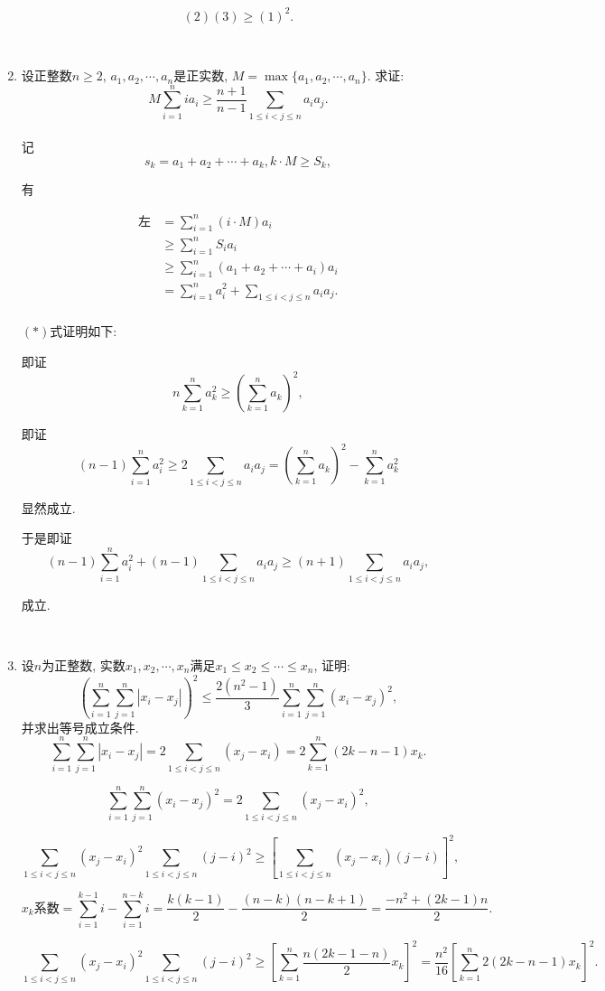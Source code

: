 \documentclass[8pt]{article}
\begin{document}
\begin{enumerate}
			$$(2) (3) \geq (1)^2.$$

		~\\

		\item 设正整数$n\geq 2$, $a_1, a_2, \cdots, a_n$是正实数, $M=\max\{a_1, a_2, \cdots, a_n\}$. 求证: $$M\sum_{i=1}^{n} ia_i \geq \frac{n+1}{n-1} \sum_{1\leq i<j\leq n} a_i a_j.$$
			~\\

			记$$s_k = a_1 + a_2 + \cdots + a_k, k \cdot M \geq S_k,$$

			有

			\begin{align*}
				\text{左} &= \sum_{i=1}^{n} (i \cdot M) a_i\\
				          &\geq \sum_{i=1}^{n} S_i a_i\\
				          &\geq \sum_{i=1}^{n} (a_1 + a_2 + \cdots + a_i) a_i \tag*{$(*)$}\\
				          &= \sum_{i=1}^{n} a_i^2 + \sum_{1\leq i<j\leq n} a_i a_j.\\
			\end{align*}

			$(*)$式证明如下:

			即证$$n\sum_{k=1}^{n} a_k^2 \geq \left(\sum_{k=1}^{n} a_k\right)^2,$$

			即证$$(n-1) \sum_{i=1}^{n} a_i^2 \geq 2\sum_{1\leq i<j\leq n} a_i a_j = \left(\sum_{k=1}^{n} a_k\right)^2 - \sum_{k=1}^{n} a_k^2$$

			显然成立.

			于是即证$$(n-1)\sum_{i=1}^{n} a_i^2 + (n-1) \sum_{1\leq i<j\leq n} a_i a_j \geq (n+1) \sum_{1\leq i<j\leq n} a_i a_j,$$

			成立.

		~\\

		\item 设$n$为正整数, 实数$x_1, x_2, \cdots, x_n$满足$x_1 \leq x_2 \leq \cdots \leq x_n$, 证明: $$\left(\sum_{i=1}^{n} \sum_{j=1}^{n} |x_i - x_j|\right)^2 \leq \frac{2(n^2-1)}{3}\sum_{i=1}^{n} \sum_{j=1}^{n} (x_i - x_j)^2,$$ 并求出等号成立条件.
			~\\

			$$\sum_{i=1}^{n} \sum_{j=1}^{n} |x_i - x_j| = 2\sum_{1\leq i<j\leq n} (x_j - x_i) = 2\sum_{k=1}^{n} (2k-n-1) x_k.$$

			$$\sum_{i=1}^{n} \sum_{j=1}^{n} (x_i - x_j)^2 = 2\sum_{1\leq i<j\leq n} (x_j - x_i)^2,$$

			$$\sum_{1\leq i<j\leq n} (x_j-x_i)^2 \sum_{1\leq i<j\leq n} (j-i)^2 \geq \left[\sum_{1\leq i<j\leq n} (x_j - x_i) (j-i)\right]^2,$$

			$$x_k\text{系数}=\sum_{i=1}^{k-1} i - \sum_{i=1}^{n-k} i = \frac{k(k-1)}{2} - \frac{(n-k)(n-k+1)}{2} = \frac{-n^2+(2k-1)n}{2}.$$

			$$\sum_{1\leq i<j\leq n} (x_j - x_i)^2 \sum_{1\leq i<j\leq n}(j-i)^2 \geq \left[\sum_{k=1}^{n} \frac{n(2k-1-n)}{2} x_k\right]^2 = \frac{n^2}{16} \left[\sum_{k=1}^{n} 2(2k-n-1) x_k\right]^2.$$

	\end{enumerate}
\end{document}
